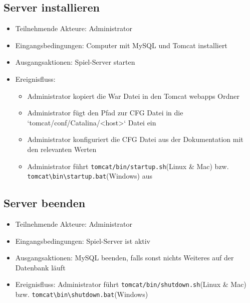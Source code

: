 \documentclass[a4paper]{scrreprt}
\begin{document}
    \subsection{Server installieren}
    \begin{itemize}
        \item Teilnehmende Akteure: \Gls{Administrator} 
        \item Eingangsbedingungen: Computer mit MySQL und Tomcat installiert
        \item Ausgangsaktionen: Spiel-Server starten
        \item Ereignisfluss: 
            \begin{itemize}
                \item \Gls{Administrator} kopiert die War Datei in den Tomcat webapps Ordner
                \item \Gls{Administrator} fügt den Pfad zur CFG Datei in die `tomcat/conf/Catalina/<host>` Datei ein
                \item \Gls{Administrator} konfiguriert die CFG Datei aus der Dokumentation mit den relevanten Werten
                \item \Gls{Administrator} führt \texttt{tomcat/bin/startup.sh}(Linux \& Mac) bzw. \texttt{tomcat\textbackslash bin\textbackslash startup.bat}(Windows) aus
            \end{itemize}
    \end{itemize}

    \subsection{Server beenden}
    \begin{itemize}
        \item Teilnehmende Akteure: \Gls{Administrator}
        \item Eingangsbedingungen: Spiel-Server ist aktiv
        \item Ausgangsaktionen: MySQL beenden, falls sonst nichts Weiteres auf der Datenbank läuft
        \item Ereignisfluss: \Gls{Administrator} führt \texttt{tomcat/bin/shutdown.sh}(Linux \& Mac) bzw. \texttt{tomcat\textbackslash bin\textbackslash shutdown.bat}(Windows)
    \end{itemize}
\end{document}
